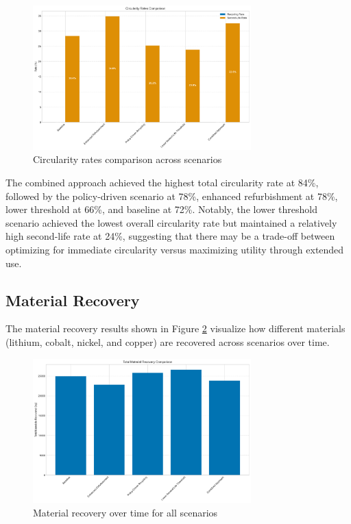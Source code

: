 \begin{figure}[htbp]
\centering
\includegraphics[width=0.75\textwidth]{figures/comparison_circularity_rates.png}
\caption{Circularity rates comparison across scenarios}
\label{fig:circularity_rates}
\end{figure}

The combined approach achieved the highest total circularity rate at 84\%, followed by the policy-driven scenario at 78\%, enhanced refurbishment at 78\%, lower threshold at 66\%, and baseline at 72\%. Notably, the lower threshold scenario achieved the lowest overall circularity rate but maintained a relatively high second-life rate at 24\%, suggesting that there may be a trade-off between optimizing for immediate circularity versus maximizing utility through extended use.

\subsection{Material Recovery}
The material recovery results shown in Figure \ref{fig:material_recovery} visualize how different materials (lithium, cobalt, nickel, and copper) are recovered across scenarios over time.

\begin{figure}[htbp]
\centering
\includegraphics[width=0.75\textwidth]{figures/comparison_material_recovery.png}
\caption{Material recovery over time for all scenarios}
\label{fig:material_recovery}
\end{figure}

